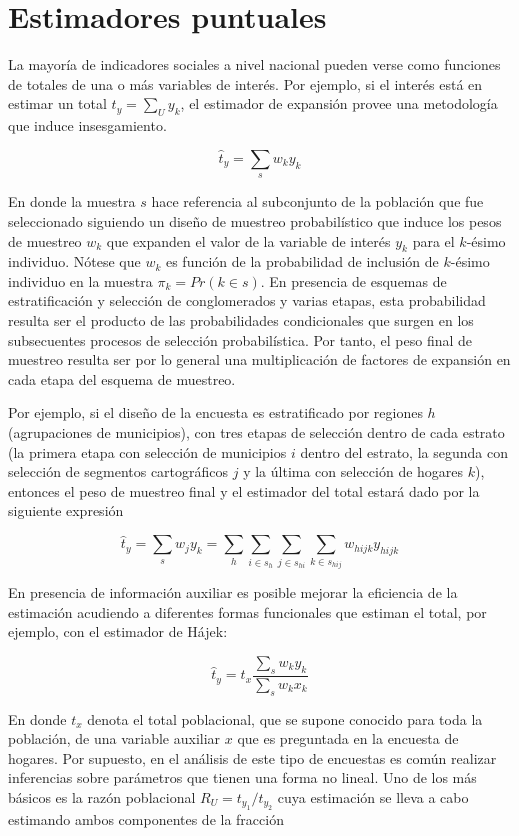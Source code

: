 \documentclass[12pt,spanish,]{book}
\begin{document}
\hypertarget{estimadores-puntuales}{%
\section{Estimadores puntuales}\label{estimadores-puntuales}}

La mayoría de indicadores sociales a nivel nacional pueden verse como funciones de totales de una o más variables de interés. Por ejemplo, si el interés está en estimar un total \(t_y=\sum_U y_k\), el estimador de expansión provee una metodología que induce insesgamiento.

\[
\hat{t}_y = \sum_s w_k y_k
\]

En donde la muestra \(s\) hace referencia al subconjunto de la población que fue seleccionado siguiendo un diseño de muestreo probabilístico que induce los pesos de muestreo \(w_k\) que expanden el valor de la variable de interés \(y_k\) para el \(k\)-ésimo individuo. Nótese que \(w_k\) es función de la probabilidad de inclusión de \(k\)-ésimo individuo en la muestra \(\pi_k=Pr(k\in s)\). En presencia de esquemas de estratificación y selección de conglomerados y varias etapas, esta probabilidad resulta ser el producto de las probabilidades condicionales que surgen en los subsecuentes procesos de selección probabilística. Por tanto, el peso final de muestreo resulta ser por lo general una multiplicación de factores de expansión en cada etapa del esquema de muestreo.

Por ejemplo, si el diseño de la encuesta es estratificado por regiones \(h\) (agrupaciones de municipios), con tres etapas de selección dentro de cada estrato (la primera etapa con selección de municipios \(i\) dentro del estrato, la segunda con selección de segmentos cartográficos \(j\) y la última con selección de hogares \(k\)), entonces el peso de muestreo final y el estimador del total estará dado por la siguiente expresión

\[
\hat{t}_y = \sum_s w_j y_k = \sum_h \sum_{i \in s_h} \sum_{j \in s_{hi}} \sum_{k \in s_{hij}} w_{hijk} y_{hijk}
\]

En presencia de información auxiliar es posible mejorar la eficiencia de la estimación acudiendo a diferentes formas funcionales que estiman el total, por ejemplo, con el estimador de Hájek:

\[
\hat{t}_y = t_x \frac{\sum_s w_k y_k}{\sum_s w_k x_k}
\]

En donde \(t_x\) denota el total poblacional, que se supone conocido para toda la población, de una variable auxiliar \(x\) que es preguntada en la encuesta de hogares. Por supuesto, en el análisis de este tipo de encuestas es común realizar inferencias sobre parámetros que tienen una forma no lineal. Uno de los más básicos es la razón poblacional \(R_U = t_{y_1} / t_{y_2}\) cuya estimación se lleva a cabo estimando ambos componentes de la fracción
\end{document}
